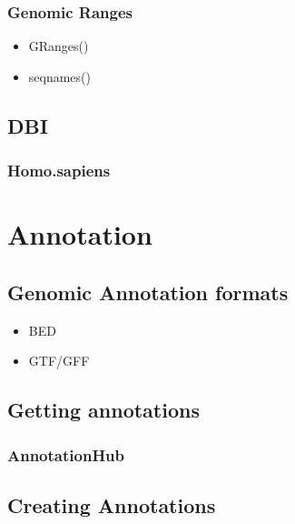 \documentclass[]{book}
\providecommand{\tightlist}{%
  \setlength{\itemsep}{0pt}\setlength{\parskip}{0pt}}
\begin{document}
\hypertarget{genomic-ranges}{%
\subsection{Genomic Ranges}\label{genomic-ranges}}

\begin{itemize}
\tightlist
\item
  GRanges()
\item
  seqnames()
\end{itemize}

\hypertarget{dbi}{%
\section{DBI}\label{dbi}}

\hypertarget{homo.sapiens}{%
\subsection{Homo.sapiens}\label{homo.sapiens}}

\hypertarget{annotation}{%
\chapter{Annotation}\label{annotation}}

\hypertarget{genomic-annotation-formats}{%
\section{Genomic Annotation formats}\label{genomic-annotation-formats}}

\begin{itemize}
\tightlist
\item
  BED
\item
  GTF/GFF
\end{itemize}

\hypertarget{getting-annotations}{%
\section{Getting annotations}\label{getting-annotations}}

\hypertarget{annotationhub}{%
\subsection{AnnotationHub}\label{annotationhub}}

\hypertarget{creating-annotations}{%
\section{Creating Annotations}\label{creating-annotations}}
\end{document}
